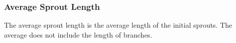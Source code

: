 \documentclass{sig-alternate}
\begin{document}
		\subsubsection{Average Sprout Length} %
			The average sprout length is the average length of the initial
			sprouts. The average does not include the length of branches.
		\label{ssub:Average Sprout Length}
		

% 		
% 
% 
% 
\end{document}
